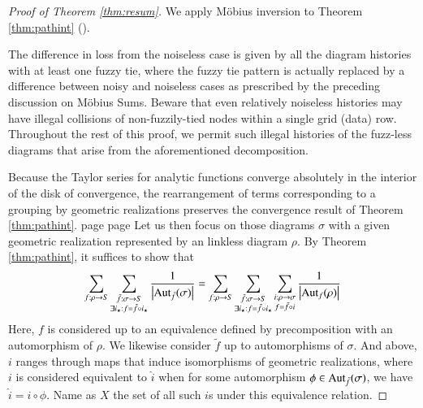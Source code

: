         \begin{proof}[Proof of Theorem \ref{thm:resum}]
            We apply M\"obius inversion %
            to Theorem
            \ref{thm:pathint} (\pageref{appendix:toward-diagrams}).

            The difference in loss from the noiseless case is given by all the
            diagram histories with at least one fuzzy tie, where the fuzzy tie
            pattern is actually replaced by a difference between noisy and
            noiseless cases as prescribed by the preceding discussion on
            M\"obius Sums.  Beware that even relatively noiseless histories
            may have illegal collisions of non-fuzzily-tied nodes within a
            single grid (data) row.  Throughout the rest of this proof, we
            permit such illegal histories of the fuzz-less diagrams that arise
            from the aforementioned decomposition.  

            Because the Taylor series for analytic functions converge
            absolutely in the interior of the disk of convergence, the
            rearrangement of terms corresponding to a grouping by geometric
            realizations preserves the convergence result of Theorem
            \ref{thm:pathint}. page 
page
            Let us then focus on those diagrams $\sigma$ with a given geometric
            realization represented by an linkless diagram $\rho$.  By
            Theorem \ref{thm:pathint}, it suffices to show that
            \begin{equation} \label{eq:hard}
                \sum_{f:\rho\to S}
                \sum_{\substack{
                    \tilde f:\sigma\to S \\
                    \exists i_\star: f=\tilde f \circ i_\star
                }}
                \frac{1}{\left|\text{\textnormal{Aut}}_{\tilde f}(\sigma)\right|}
                =
                \sum_{f:\rho\to S}
                \sum_{\substack{
                    \tilde f:\sigma\to S \\
                    \exists i_\star: f=\tilde f \circ i_\star
                }}
                \sum_{\substack{
                    i:\rho\to\sigma \\
                    f = \tilde f \circ i
                }}
                \frac{1}{\left|\text{\textnormal{Aut}}_{f}(\rho)\right|}
            \end{equation}
            Here, $f$ is considered up to an equivalence defined by
            precomposition with an automorphism of $\rho$.  We likewise
            consider $\tilde f$ up to automorphisms of $\sigma$.  And above,
            $i$ ranges through maps that induce isomorphisms of geometric
            realizations, where $i$ is considered equivalent to $\hat i$ when
            for some automorphism $\phi \in \text{\textnormal{Aut}}_{\tilde f}(\sigma)$, we have
            $\hat i = i \circ \phi$.  Name as $X$ the set of all such $i$s
            under this equivalence relation.


\end{proof}
